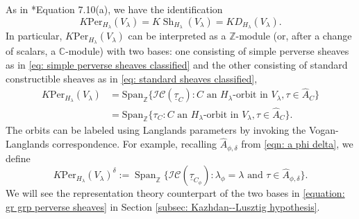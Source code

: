 \documentclass[11pt,letterpaper]{amsart}
\newcommand{\BC}{\mathbb{C}}
\newcommand{\irrepdual}[1]{\widehat{#1}}
\newcommand{\Per}{\mathrm{Per}}
\newcommand{\locsys}[2]{\underline{#1}_{#2}}
\newcommand{\stsh}[2]{{#1}_{#2}}
\renewcommand{\1}{\mathbbm{1}}
\numberwithin{equation}{section}
\begin{document}
{As in \cite{ABV92}*{Equation 7.10(a)}, we have the identification
\[K\Per_{H_\lambda}(V_\lambda)=K\operatorname{Sh}_{H_\lambda}(V_\lambda)=KD_{H_\lambda}(V_\lambda).\]
In particular, $K\Per_{H_\lambda}(V_\lambda)$ can be interpreted as a $\mathbb{Z}$-module (or, after a change of scalars, a $\BC$-module) with two bases: one consisting of simple perverse sheaves as in \eqref{eq: simple perverse sheaves classified} and the other consisting of standard constructible sheaves as in \eqref{eq: standard sheaves classified},
\begin{equation}\label{equation: gr grp perverse sheaves}
\begin{aligned}
    K\Per_{H_\lambda}(V_\lambda)&=\mathrm{Span}_{\mathbb{Z}}\{\mathcal{IC}(\locsys{\tau}{C}): C \text{ an }H_\lambda\text{-orbit in }V_\lambda, \tau \in \irrepdual{A}_C \}\\
    &=\mathrm{Span}_{\mathbb{Z}}\{\stsh{\tau}{C}: C \text{ an }H_\lambda\text{-orbit in }V_\lambda, \tau \in \irrepdual{A}_C \} {.}
\end{aligned}
\end{equation}
The orbits can be labeled using Langlands parameters by invoking the Vogan-Langlands correspondence. For example, recalling $\irrepdual{A}_{\phi,\delta}$ from \eqref{eqn: a phi delta}, we define
\begin{equation}\label{equation: kper subspace delta}
    K\Per_{H_\lambda}(V_\lambda)^\delta := \operatorname{Span}_{\mathbb{Z}} \{\mathcal{IC}(\locsys{\tau}{C_\phi}): \lambda_\phi=\lambda \text{ and } \tau \in  \irrepdual{A}_{\phi,\delta}\} {.}
\end{equation}
{We will see the representation theory counterpart of the two bases in \eqref{equation: gr grp perverse sheaves} in Section \ref{subsec: Kazhdan--Lusztig hypothesis}.}



}
\end{document}
